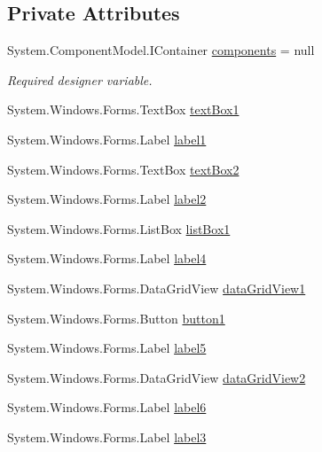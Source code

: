 \subsection*{Private Attributes}
\begin{DoxyCompactItemize}
\item 
System.\+Component\+Model.\+I\+Container \hyperlink{classPCO_1_1__0_1_1AthleteForm_a1f16b28e2014bb3d3819173c19fba17e}{components} = null
\begin{DoxyCompactList}\small\item\em Required designer variable. \end{DoxyCompactList}\item 
System.\+Windows.\+Forms.\+Text\+Box \hyperlink{classPCO_1_1__0_1_1AthleteForm_a1e440213d1900de946894fdff1854cd0}{text\+Box1}
\item 
System.\+Windows.\+Forms.\+Label \hyperlink{classPCO_1_1__0_1_1AthleteForm_abe2a3d915a0c7b22f4f5b81230ad8278}{label1}
\item 
System.\+Windows.\+Forms.\+Text\+Box \hyperlink{classPCO_1_1__0_1_1AthleteForm_a2099ea4a6adbe82e58e924892ba3154d}{text\+Box2}
\item 
System.\+Windows.\+Forms.\+Label \hyperlink{classPCO_1_1__0_1_1AthleteForm_af0c25b3c3b035069efd110610a46e91c}{label2}
\item 
System.\+Windows.\+Forms.\+List\+Box \hyperlink{classPCO_1_1__0_1_1AthleteForm_a0564d30b38ba13222cf51a999a972421}{list\+Box1}
\item 
System.\+Windows.\+Forms.\+Label \hyperlink{classPCO_1_1__0_1_1AthleteForm_a8a41e84122bfaf6f2aecc58f2f016e83}{label4}
\item 
System.\+Windows.\+Forms.\+Data\+Grid\+View \hyperlink{classPCO_1_1__0_1_1AthleteForm_ae32ac29356b096ba9f5e22ba20b58348}{data\+Grid\+View1}
\item 
System.\+Windows.\+Forms.\+Button \hyperlink{classPCO_1_1__0_1_1AthleteForm_acabccda502389ae2d4d220140b058b79}{button1}
\item 
System.\+Windows.\+Forms.\+Label \hyperlink{classPCO_1_1__0_1_1AthleteForm_a916d83226b3339f4c9f084b225e5c4f2}{label5}
\item 
System.\+Windows.\+Forms.\+Data\+Grid\+View \hyperlink{classPCO_1_1__0_1_1AthleteForm_a7f4664bac19be7add32755591473e803}{data\+Grid\+View2}
\item 
System.\+Windows.\+Forms.\+Label \hyperlink{classPCO_1_1__0_1_1AthleteForm_a9d417f399c88183f59ea21d20f0ecf6f}{label6}
\item 
System.\+Windows.\+Forms.\+Label \hyperlink{classPCO_1_1__0_1_1AthleteForm_a06304d0926cac7dffedc7e77cd224555}{label3}

\end{DoxyCompactItemize}
